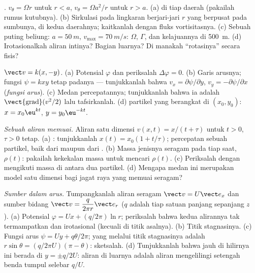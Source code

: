\begin{exercise}[$\star\star$]\label{exo:b2:fluid-kinematics:8}
\emph{.} $v_\theta = \Omega r$ untuk $r < a$, $v_\theta = \Omega a^2/r$
untuk $r > a$. (a)  di tiap daerah (pakailah rumus kutubnya). (b)
Sirkulasi pada lingkaran berjari-jari $r$ yang berpusat pada sumbunya, di kedua
daerahnya; kaitkanlah dengan fluks vortisitasnya. (c) Sebuah puting beliung: $a = \qty{50}{m}$,
$v_{\max} = \qty{70}{m/s}$: $\Omega$, $\Gamma$, dan kelajuannya di \qty{500}{m}.
(d) Irotasionalkah aliran intinya? Bagian luarnya? Di manakah
``rotasinya'' secara fisis?
\end{exercise}

\begin{exercise}[$\star\star$]\label{exo:b2:fluid-kinematics:9}
\emph{} $\vect v = k(x, -y)$. (a) Potensial $\varphi$ dan
periksalah $\Delta\varphi = 0$. (b) Garis arusnya; fungsi $\psi = kxy$
tetap padanya --- tunjukkanlah bahwa $v_x = \partial\psi/\partial y$, $v_y = -\partial\psi/
\partial x$ (\emph{fungsi arus}). (c) Medan percepatannya; tunjukkanlah bahwa ia
adalah $\operatorname{\vect{grad}}(v^2/2)$ lalu tafsirkanlah. (d) 
partikel yang berangkat di $(x_0, y_0)$: $x = x_0\eu^{kt}$, $y = y_0\eu^{-kt}$.
\end{exercise}

\begin{exercise}[$\star\star\star$]\label{exo:b2:fluid-kinematics:10}
\emph{Sebuah aliran memuai.} Aliran satu dimensi $v(x, t) = x/(t + \tau)$
untuk $t > 0$, $\tau > 0$ tetap. (a) : tunjukkanlah $x(t) = x_0(1 +
t/\tau)$; percepatan sebuah partikel, baik dari  maupun dari
. (b) Massa jenisnya seragam pada tiap saat,
$\rho(t)$: pakailah kekekalan massa untuk mencari $\rho(t)$. (c) Periksalah dengan
mengikuti massa di antara dua partikel. (d) Mengapa medan ini merupakan
model satu dimensi bagi jagat raya yang memuai seragam?
\end{exercise}

\begin{exercise}[$\star\star\star$]\label{exo:b2:fluid-kinematics:11}
\emph{Sumber dalam arus.} Tumpangkanlah aliran seragam $\vect v = U\vect e_x$
dan sumber bidang $\vect v = \dfrac{q}{2\pi r}\vect e_r$ ($q$ adalah  tiap satuan panjang sepanjang $z$). (a) Potensial $\varphi = Ux +
(q/2\pi)\ln r$; periksalah bahwa kedua alirannya tak termampatkan dan irotasional
(kecuali di titik asalnya). (b) Titik stagnasinya. (c) Fungsi arus $\psi
= Uy + q\theta/2\pi$;  yang melalui titik stagnasinya adalah
$r\sin\theta = (q/2\pi U)(\pi - \theta)$: sketsalah. (d) Tunjukkanlah bahwa jauh
di hilirnya  ini berada di $y = \pm q/2U$: aliran di luarnya adalah
aliran mengelilingi setengah benda tumpul selebar $q/U$.
\end{exercise}

